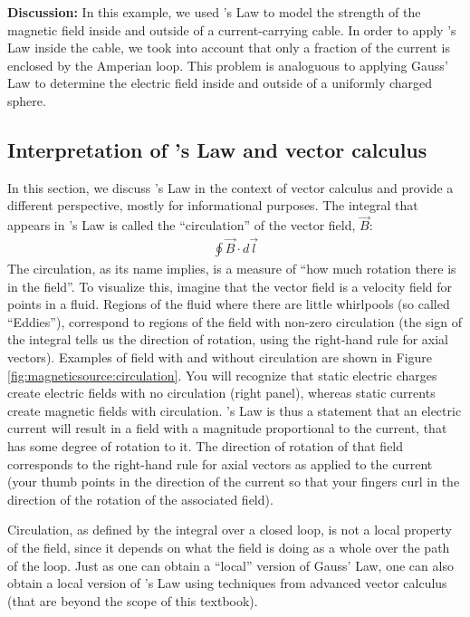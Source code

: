 \begin{example}
\textbf{Discussion:} In this example, we used \ampere's Law to model the strength of the magnetic field inside and outside of a current-carrying cable. In order to apply \ampere's Law inside the cable, we took into account that only a fraction of the current is enclosed by the Amperian loop. This problem is analoguous to applying Gauss' Law to determine the electric field inside and outside of a uniformly charged sphere. 
\end{example}

\subsection{Interpretation of \ampere's Law and vector calculus} 
In this section, we discuss \ampere's Law in the context of vector calculus and provide a different perspective, mostly for informational purposes. The integral that appears in \ampere's Law is called the ``circulation'' of the vector field, $\vec B$:
\begin{align*}
\oint \vec B \cdot d\vec l
\end{align*}
The circulation, as its name implies, is a measure of ``how much rotation there is in the field''. To visualize this, imagine that the vector field is a velocity field for points in a fluid. Regions of the fluid where there are little whirlpools (so called ``Eddies''), correspond to regions of the field with non-zero circulation (the sign of the integral tells us the direction of rotation, using the right-hand rule for axial vectors). Examples of field with and without circulation are shown in Figure \ref{fig:magneticsource:circulation}. You will recognize that static electric charges create electric fields with no circulation (right panel), whereas static currents create magnetic fields with circulation.
\ampere's Law is thus a statement that an electric current will result in a field with a magnitude proportional to the current, that has some degree of rotation to it. The direction of rotation of that field corresponds to the right-hand rule for axial vectors as applied to the current (your thumb points in the direction of the current so that your fingers curl in the direction of the rotation of the associated field). 

Circulation, as defined by the integral over a closed loop, is not a local property of the field, since it depends on what the field is doing as a whole over the path of the loop. Just as one can obtain a ``local'' version of  Gauss' Law, one can also obtain a local version of \ampere's Law using techniques from advanced vector calculus (that are beyond the scope of this textbook).

